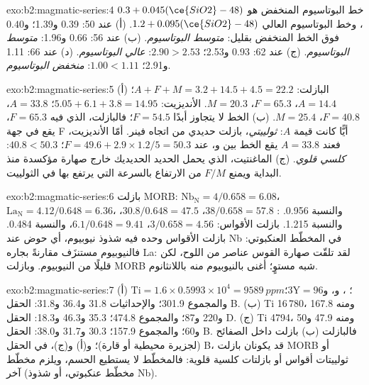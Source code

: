 \begin{solution}{exo:b2:magmatic-series:4}
خط البوتاسيوم المنخفض هو $0.3 + 0.045(\ce{SiO2} - 48)$، وخط البوتاسيوم العالي $1.2 +
0.095(\ce{SiO2} - 48)$. (أ) عند 50: 0.39 و1.39؛ و$0.40$ فوق الخط المنخفض بقليل:
\emph{متوسط البوتاسيوم}. (ب) عند 56: 0.66 و1.96: \emph{متوسط البوتاسيوم}. (ج) عند 62: 0.93 و2.53؛
$2.90 > 2.53$: \emph{عالي البوتاسيوم}. (د) عند 66: 1.11 و2.91؛ $1.00 < 1.11$: \emph{منخفض البوتاسيوم}.
\end{solution}

\begin{solution}{exo:b2:magmatic-series:5}
(أ) البازلت: $A + F + M = 3.2 + 14.5 + 4.5 = 22.2$؛ $A = 14.4$، $F = 65.3$، $M = 20.3$.
الأنديزيت: $5.05 + 6.1 + 3.8 = 14.95$؛ $A = 33.8$، $F = 40.8$، $M = 25.4$. (ب) الخط
لا يتجاوز أبدًا $F = 54.5$؛ فالبازلت، الذي فيه $F = 65.3$، يقع في جهة F
أيًّا كانت قيمة $A$: \emph{ثولييتي}، بازلت حديدي من اتجاه فينر. أمّا
الأنديزيت، فعند $A = 33.8$ يقع الخط بين  و، عند $F =
49.6 + 2.9\times1.2/5 = 50.3$؛ $40.8 < 50.3$: \emph{كلسي قلوي}. (ج) الماغنتيت،
الذي يحمل الحديد الحديديك خارج صهارة مؤكسدة منذ البداية ويمنع $F/M$ من
الارتفاع بالسرعة التي يرتفع بها في الثولييت.
\end{solution}

\begin{solution}{exo:b2:magmatic-series:6}
بازلت MORB: $\mathrm{Nb_N} = 4/0.658 = 6.08$، $\mathrm{La_N} = 4.12/0.648 = 6.36$، والنسبة
0.956. : $38/0.658 = 57.8$، $30.8/0.648 = 47.5$، والنسبة 1.215. بازلت
الأقواس: $3/0.658 = 4.56$، $6.1/0.648 = 9.41$، والنسبة 0.484. بازلت الأقواس وحده فيه
شذوذ نيوبيوم، أي حوض عند Nb في المخطّط العنكبوتي: فالنيوبيوم مستنزَف مقارنةً
بجاره La: لقد تلقّت صهارة القوس عناصر من اللوح، لكن قليلًا من
النيوبيوم. وبازلت MORB شبه مستوٍ؛  أغنى
بالنيوبيوم منه باللانثانوم.
\end{solution}

\begin{solution}{exo:b2:magmatic-series:7}
(أ) $\mathrm{Ti} = 1.6\times0.5993\times10^4 = \qty{9589}{ppm}$؛ ، و، و$3\mathrm Y = 96$؛ والمجموع 301.9؛ والإحداثيات 31.8 و36.4 و31.8: الحقل B. (ب) Ti
16\,780، ومنه 167.8 و220 و87؛ والمجموع 474.8؛ 35.3 و46.3 و18.3: الحقل D. (ج) Ti 4794، ومنه
47.9 و50 و60؛ والمجموع 157.9؛ 30.3 و31.7 و38.0: الحقل B. فالبازلت (ب) بازلت داخل الصفائح
(لجزيرة محيطية أو قارة)؛ و(أ) و(ج)، في الحقل B، قد يكونان بازلت MORB أو ثولييتات أقواس
أو بازلتات كلسية قلوية: فالمخطّط لا يستطيع الحسم، ويلزم مخطّط آخر (مخطّط
عنكبوتي، أو شذوذ Nb).
\end{solution}

